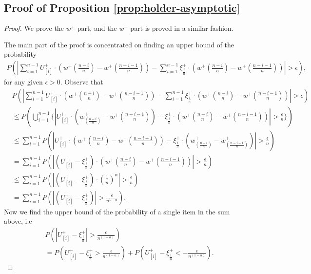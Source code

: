 \documentclass{article}
\numberwithin{equation}{section}
\numberwithin{theorem}{section}
\begin{document}
\subsection*{Proof of Proposition \ref{prop:holder-asymptotic}}
\begin{proof}
We prove the $w^+$ part, and the $w^-$ part is proved in a similar fashion.

The main part of the proof is concentrated on finding an upper bound of the probability
\begin{align}
P ( \left| \sum_{i=1}^{n-1} U^+_{[i]} \cdot (w^+(\frac{n-i}{n} )  - w^+(\frac{n-i-1}{n} ) ) -
\sum_{i=1}^{n-1} \xi^+_{\frac{i}{n}} \cdot (w^+(\frac{n-i}{n} )  - w^+(\frac{n-i-1}{n} ) ) \right| >
\epsilon),
\end{align}
for any given $\epsilon>0$.
Observe that
\begin{align*}
& P ( \left| \sum_{i=1}^{n-1} U^+_{[i]} \cdot (w^+(\frac{n-i}{n} )  - w^+(\frac{n-i-1}{n} ) ) -
\sum_{i=1}^{n-1} \xi^+_{\frac{i}{n}} \cdot (w^+(\frac{n-i}{n} )  - w^+(\frac{n-i-1}{n} ) ) \right| >
\epsilon) \\ & \leq P ( \bigcup _{i=1}^{n-1} \{ \left| U^+_{[i]} \cdot (w^+_(\frac{n-i}{n}) -
w^+{(\frac{n-i-1}{n})}) - \xi^+_{\frac{i}{n}} \cdot (w^+(\frac{n-i}{n} )  - w^+(\frac{n-i-1}{n} ) )
\right| > \frac{\epsilon}{n} \}) \\ & \leq \sum _{i=1}^{n-1} P ( \left| U^+_{[i]} \cdot
(w^+(\frac{n-i}{n} )  - w^+(\frac{n-i-1}{n} ) ) - \xi^+_{\frac{i}{n}} \cdot (w^+_(\frac{n-i}{n}) -
w^+_(\frac{n-i-1}{n})) \right| > \frac{\epsilon}{n}) \\ & = \sum _{i=1}^{n-1} P ( \left| ( U^+_{[i]} -
\xi^+_{\frac{i}{n}}) \cdot (w^+(\frac{n-i}{n} )  - w^+(\frac{n-i-1}{n} ) ) \right| > \frac{\epsilon}{n})
\\ & \leq \sum _{i=1}^{n-1} P ( \left| ( U^+_{[i]} - \xi^+_{\frac{i}{n}}) \cdot (\frac{1}{n})^{\alpha}
\right| > \frac{\epsilon}{n}) \\ & = \sum _{i=1}^{n-1} P ( \left| ( U^+_{[i]} - \xi^+_{\frac{i}{n}})
\right| > \frac{\epsilon}{n^{1-\alpha}}).
\end{align*}
Now we find the upper bound of the probability of a single item in the sum above, i.e
\begin{align*}
& P( \left | U^+_{[i]} - \xi^+_{\frac{i}{n}} \right | > \frac {\epsilon} {n^{(1-\alpha)}}) \\ & = P (
    U^+_{[i]} - \xi^+_{\frac{i}{n}} > \frac {\epsilon} {n^{(1-\alpha)}}) + P ( U^+_{[i]} -
    \xi^+_{\frac{i}{n}} < - \frac {\epsilon} {n^{(1-\alpha)}}).
\end{align*} 


\end{proof}
\end{document}
